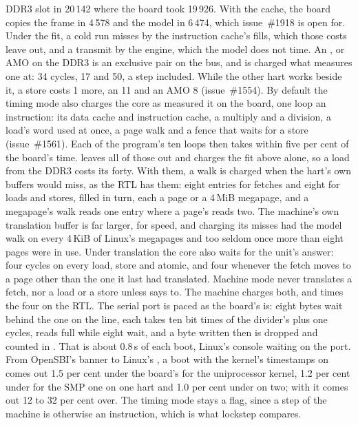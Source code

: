 \documentclass[journal,onecolumn,9pt]{IEEEtran}
\begin{document}
DDR3 slot in 20\,142 where the board took 19\,926. With the cache, the
board copies the frame in 4\,578 and the model in 6\,474, which
issue~\#1918 is open for. Under the fit, a cold run misses by the
instruction cache's fills, which those costs leave out, and a transmit
by the engine, which the model does not time.
An ,  or AMO on the DDR3 is an exclusive pair on
the bus, and is charged what  measures one at: 34
cycles, 17 and 50, a step included. While the other hart works beside
it, a store costs 1 more, an  11 and an AMO 8 (issue~\#1554).
By default the timing mode also charges the core as 
measured it on the board, one loop an instruction: its data cache and
instruction cache, a multiply and a division, a load's word used at
once, a page walk and a fence that waits for a store (issue~\#1561).
Each of the program's ten loops then takes within five per cent of the
board's time.  leaves all of those out and charges
the fit above alone, so a load from the DDR3 costs its forty. With
them, a walk is charged when the hart's own buffers would miss, as the RTL has them:
eight entries for fetches and eight for loads and stores, filled in
turn, each a page or a 4\,MiB megapage, and a megapage's walk reads
one entry where a page's reads two. The machine's own translation
buffer is far larger, for speed, and charging its misses had the
model walk on every 4\,KiB of Linux's megapages and too seldom once
more than eight pages were in use. Under translation the core also
waits for the unit's answer: four cycles on every load, store and
atomic, and four whenever the fetch moves to a page other than the one
it last had translated. Machine mode never translates a fetch, nor a
load or a store unless  says to. The machine charges both,
and  times the four on the RTL. The serial port
is paced as the board's is: eight bytes wait behind the one on the
line, each takes ten bit times of the divider's  plus one
cycles,  reads full while eight wait, and a byte written
then is dropped and counted in . That is about 0.8\,s of
each boot, Linux's console waiting on the port. From OpenSBI's banner
to Linux's , a boot with the kernel's timestamps on comes
out 1.5 per cent under the board's for the uniprocessor kernel, 1.2
per cent under for the SMP one on one hart and 1.0 per cent under on
two; with  it comes out 12 to 32 per cent over.
The timing mode stays a flag, since a step of the machine
is otherwise an instruction, which is what lockstep compares.
\end{document}
